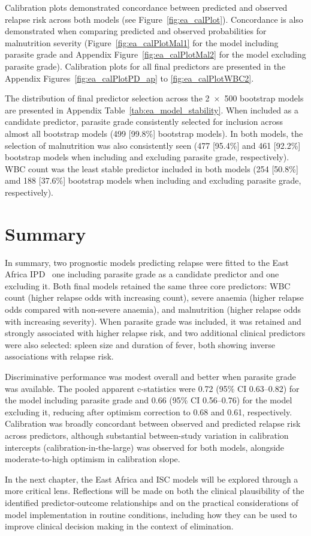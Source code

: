 Calibration plots demonstrated concordance between predicted and observed relapse risk across both models (see Figure~\ref{fig:ea_calPlot}). Concordance is also demonstrated when comparing predicted and observed probabilities for malnutrition severity (Figure~\ref{fig:ea_calPlotMal1} for the model including parasite grade and Appendix Figure~\ref{fig:ea_calPlotMal2} for the model excluding parasite grade). Calibration plots for all final predictors are presented in the Appendix Figures~\ref{fig:ea_calPlotPD_ap} to \ref{fig:ea_calPlotWBC2}.

The distribution of final predictor selection across the 2~$\times$~500 bootstrap models are presented in Appendix Table~\ref{tab:ea_model_stability}. When included as a candidate predictor, parasite grade consistently selected for inclusion across almost all bootstrap models (499 [99.8\%] bootstrap models). In both models, the selection of malnutrition was also consistently seen (477 [95.4\%] and 461 [92.2\%] bootstrap models when including and excluding parasite grade, respectively). WBC count was the least stable predictor included in both models (254 [50.8\%] amd 188 [37.6\%] bootstrap models when including and excluding parasite grade, respectively).

\section{Summary}

In summary, two prognostic models predicting relapse were fitted to the East Africa IPD \textemdash\ one including parasite grade as a candidate predictor and one excluding it. Both final models retained the same three core predictors: WBC count (higher relapse odds with increasing count), severe anaemia (higher relapse odds compared with non-severe anaemia), and malnutrition (higher relapse odds with increasing severity). When parasite grade was included, it was retained and strongly associated with higher relapse risk, and two additional clinical predictors were also selected: spleen size and duration of fever, both showing inverse associations with relapse risk.

Discriminative performance was modest overall and better when parasite grade was available. The pooled apparent c-statistics were 0.72 (95\% CI 0.63--0.82) for the model including parasite grade and 0.66 (95\% CI 0.56--0.76) for the model excluding it, reducing after optimism correction to 0.68 and 0.61, respectively. Calibration was broadly concordant between observed and predicted relapse risk across predictors, although substantial between-study variation in calibration intercepts (calibration-in-the-large) was observed for both models, alongside moderate-to-high optimism in calibration slope.

In the next chapter, the East Africa and ISC models will be explored through a more critical lens. Reflections will be made on both the clinical plausibility of the identified predictor-outcome relationships and on the practical considerations of model implementation in routine conditions, including how they can be used to improve clinical decision making in the context of elimination.